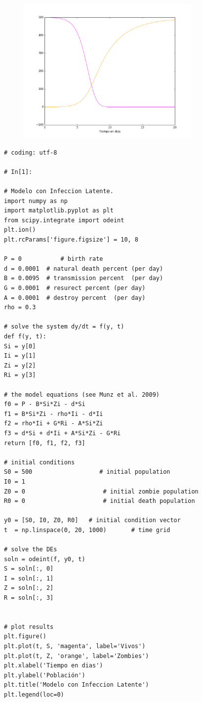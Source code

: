\documentclass[12pt]{article}
\begin{document}
\begin{figure}[H]
	\includegraphics[width=9cm]{infeccion.png}
\end{figure}

\begin{verbatim}
# coding: utf-8

# In[1]:

# Modelo con Infeccion Latente.
import numpy as np
import matplotlib.pyplot as plt
from scipy.integrate import odeint
plt.ion()
plt.rcParams['figure.figsize'] = 10, 8

P = 0           # birth rate
d = 0.0001  # natural death percent (per day)
B = 0.0095  # transmission percent  (per day)
G = 0.0001  # resurect percent (per day)
A = 0.0001  # destroy percent  (per day)
rho = 0.3

# solve the system dy/dt = f(y, t)
def f(y, t):
Si = y[0]
Ii = y[1]
Zi = y[2]
Ri = y[3]

# the model equations (see Munz et al. 2009)
f0 = P - B*Si*Zi - d*Si
f1 = B*Si*Zi - rho*Ii - d*Ii
f2 = rho*Ii + G*Ri - A*Si*Zi
f3 = d*Si + d*Ii + A*Si*Zi - G*Ri
return [f0, f1, f2, f3]

# initial conditions
S0 = 500                   # initial population
I0 = 1
Z0 = 0                      # initial zombie population
R0 = 0                      # initial death population

y0 = [S0, I0, Z0, R0]   # initial condition vector
t  = np.linspace(0, 20, 1000)       # time grid

# solve the DEs
soln = odeint(f, y0, t)
S = soln[:, 0]
I = soln[:, 1]
Z = soln[:, 2]
R = soln[:, 3]


# plot results
plt.figure()
plt.plot(t, S, 'magenta', label='Vivos')
plt.plot(t, Z, 'orange', label='Zombies')
plt.xlabel('Tiempo en dias')
plt.ylabel('Población')
plt.title('Modelo con Infeccion Latente')
plt.legend(loc=0)
\end{verbatim}
\end{document}
